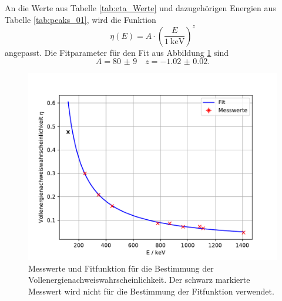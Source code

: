 An die Werte aus Tabelle \ref{tab:eta_Werte} und dazugehörigen Energien aus Tabelle \ref{tab:peaks_01}, wird die Funktion
\begin{equation*}
  \eta(E) = A\cdot \left(\frac{E}{\SI{1}{\kilo\eV}}\right)^z
\end{equation*}
angepasst. 
Die Fitparameter für den Fit aus Abbildung \ref{fig:Vollenergienachweiswahrscheinlichkeit} sind 
\begin{equation*}
  A = \num{80(9)} \quad z = \num{-1.02(2)}.
\end{equation*}
\begin{figure}
  \centering
  \caption{Messwerte und Fitfunktion für die Bestimmung der Vollenergienachweiswahrscheinlichkeit. Der schwarz markierte Messwert wird nicht für die Bestimmung der Fitfunktion verwendet.}
  \label{fig:Vollenergienachweiswahrscheinlichkeit}
  \includegraphics[width = \textwidth, keepaspectratio]{figure/Vollenergienachweiswahrscheinlichkeit.pdf}
\end{figure}
\FloatBarrier
